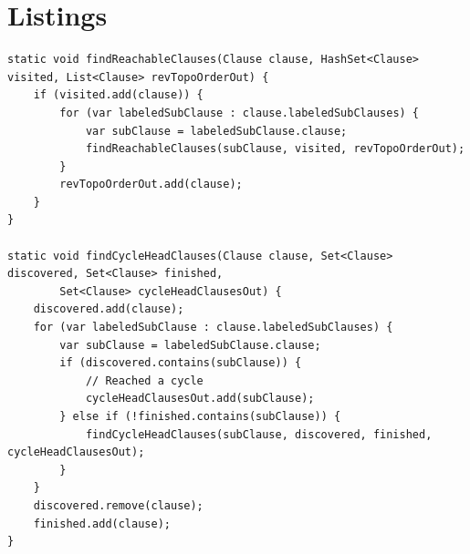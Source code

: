 \documentclass[manuscript,screen]{acmart}
\begin{document}



\newpage\section*{Listings}

\begin{lstlisting}[caption={Algorithm for topologically sorting clauses into bottom-up order},label={lst:topoSort}]
static void findReachableClauses(Clause clause, HashSet<Clause> visited, List<Clause> revTopoOrderOut) {
    if (visited.add(clause)) {
        for (var labeledSubClause : clause.labeledSubClauses) {
            var subClause = labeledSubClause.clause;
            findReachableClauses(subClause, visited, revTopoOrderOut);
        }
        revTopoOrderOut.add(clause);
    }
}

static void findCycleHeadClauses(Clause clause, Set<Clause> discovered, Set<Clause> finished,
        Set<Clause> cycleHeadClausesOut) {
    discovered.add(clause);
    for (var labeledSubClause : clause.labeledSubClauses) {
        var subClause = labeledSubClause.clause;
        if (discovered.contains(subClause)) {
            // Reached a cycle
            cycleHeadClausesOut.add(subClause);
        } else if (!finished.contains(subClause)) {
            findCycleHeadClauses(subClause, discovered, finished, cycleHeadClausesOut);
        }
    }
    discovered.remove(clause);
    finished.add(clause);
}


\end{lstlisting}
\end{document}
